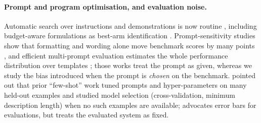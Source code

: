 \paragraph{Prompt and program optimisation, and evaluation noise.}
Automatic search over instructions and demonstrations is now routine \citep{zhou2022large,khattab2023dspy,opsahl2024optimizing}, including budget-aware formulations as best-arm identification \citep{shi2024efficient}.
Prompt-sensitivity studies show that formatting and wording alone move benchmark scores by many points \citep{sclar2023quantifying,mizrahi2024state}, and efficient multi-prompt evaluation estimates the whole performance distribution over templates \citep{polo2024efficient}; those works treat the prompt as given, whereas we study the bias introduced when the prompt is \emph{chosen} on the benchmark.
\citet{perez2021true} pointed out that prior ``few-shot'' work tuned prompts and hyper-parameters on many held-out examples and studied model selection (cross-validation, minimum description length) when no such examples are available; \citet{miller2024adding} advocates error bars for evaluations, but treats the evaluated system as fixed.
